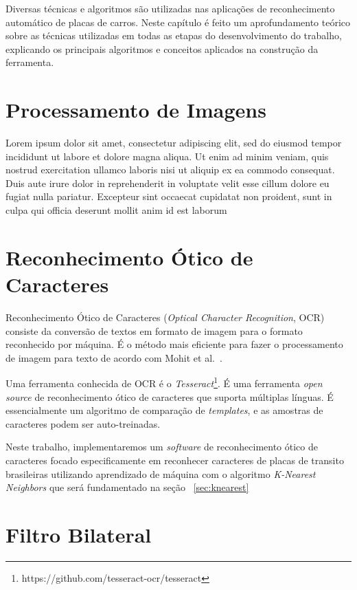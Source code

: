 Diversas técnicas e algoritmos são utilizadas nas aplicações de reconhecimento automático de placas de carros. Neste capítulo é feito um aprofundamento teórico sobre as técnicas utilizadas em todas as etapas do desenvolvimento do trabalho, explicando os principais algoritmos e conceitos aplicados na construção da ferramenta.

\section{Processamento de Imagens}
\label{sec:processamentoimagens}

Lorem ipsum dolor sit amet, consectetur adipiscing elit, sed do eiusmod tempor incididunt ut labore et dolore magna aliqua. Ut enim ad minim veniam, quis nostrud exercitation ullamco laboris nisi ut aliquip ex ea commodo consequat. Duis aute irure dolor in reprehenderit in voluptate velit esse cillum dolore eu fugiat nulla pariatur. Excepteur sint occaecat cupidatat non proident, sunt in culpa qui officia deserunt mollit anim id est laborum

\section{Reconhecimento Ótico de Caracteres}
\label{sec:ocr}

Reconhecimento Ótico de Caracteres (\emph{Optical Character Recognition}, OCR)
consiste da conversão de textos em formato de imagem para o formato reconhecido
por máquina. É o método mais eficiente para fazer o processamento de imagem para
texto de acordo com Mohit et al.~\cite{mohit2015designing}.

Uma ferramenta conhecida de OCR é o
\emph{Tesseract}\footnote{https://github.com/tesseract-ocr/tesseract}. É uma ferramenta
\emph{open source} de reconhecimento ótico de caracteres que suporta múltiplas
línguas.  É essencialmente um algoritmo de comparação de \emph{templates}, e as
amostras de caracteres podem ser auto-treinadas.~\cite{ho2016intelligent}

Neste trabalho, implementaremos um \emph{software} de reconhecimento ótico de caracteres focado especificamente em reconhecer caracteres de placas de transito brasileiras utilizando aprendizado de máquina com o algoritmo \emph{K-Nearest Neighbors} que será fundamentado na seção ~\ref{sec:knearest}

\section{Filtro Bilateral}
\label{sec:bilateralfilter}

